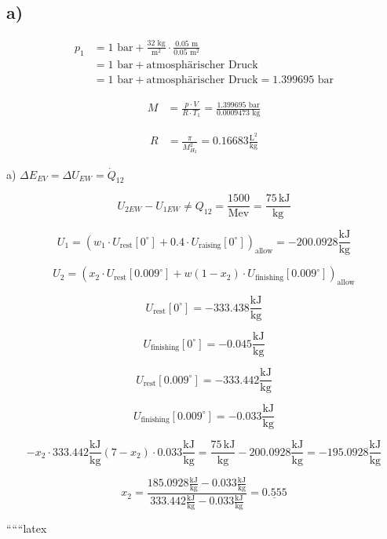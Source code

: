 

\subsection*{a)}

\begin{align*}
p_1 &= 1 \text{ bar} + \frac{32 \text{ kg}}{\text{m}^2} \cdot \frac{0.05 \text{ m}}{0.05 \text{ m}^2} \\
&= 1 \text{ bar} + \text{atmosphärischer Druck} \\
&= 1 \text{ bar} + \text{atmosphärischer Druck} = 1.399695 \text{ bar}
\end{align*}

\begin{align*}
M &= \frac{p \cdot V}{R \cdot T_1} = \frac{1.399695 \text{ bar}}{0.0009473 \text{ kg}}
\end{align*}

\begin{align*}
R &= \frac{\pi}{M_{H_2}^2} = 0.16683 \frac{\text{L}^2}{\text{kg}}
\end{align*}

a) \(\Delta E_{EV} = \Delta U_{EW} = \dot{Q}_{12}\)

\[
U_{2EW} - U_{1EW} \neq Q_{12} = \frac{1500}{\text{Mev}} = \frac{75 \, \text{kJ}}{\text{kg}}
\]

\[
U_1 = (w_1 \cdot U_{\text{rest}}[0^\circ] + 0.4 \cdot U_{\text{raising}}[0^\circ])_{\text{allow}} = -200.0928 \frac{\text{kJ}}{\text{kg}}
\]

\[
U_2 = \left( x_2 \cdot U_{\text{rest}}[0.009^\circ] + w(1 - x_2) \cdot U_{\text{finishing}}[0.009^\circ] \right)_{\text{allow}}
\]

\[
U_{\text{rest}}[0^\circ] = -333.438 \frac{\text{kJ}}{\text{kg}}
\]

\[
U_{\text{finishing}}[0^\circ] = -0.045 \frac{\text{kJ}}{\text{kg}}
\]

\[
U_{\text{rest}}[0.009^\circ] = -333.442 \frac{\text{kJ}}{\text{kg}}
\]

\[
U_{\text{finishing}}[0.009^\circ] = -0.033 \frac{\text{kJ}}{\text{kg}}
\]

\[
- x_2 \cdot 333.442 \frac{\text{kJ}}{\text{kg}} (7 - x_2) \cdot 0.033 \frac{\text{kJ}}{\text{kg}} = \frac{75 \, \text{kJ}}{\text{kg}} - 200.0928 \frac{\text{kJ}}{\text{kg}} = -195.0928 \frac{\text{kJ}}{\text{kg}}
\]

\[
x_2 = \frac{185.0928 \frac{\text{kJ}}{\text{kg}} - 0.033 \frac{\text{kJ}}{\text{kg}}}{333.442 \frac{\text{kJ}}{\text{kg}} - 0.033 \frac{\text{kJ}}{\text{kg}}} = \underline{0.555}
\]

``````latex
